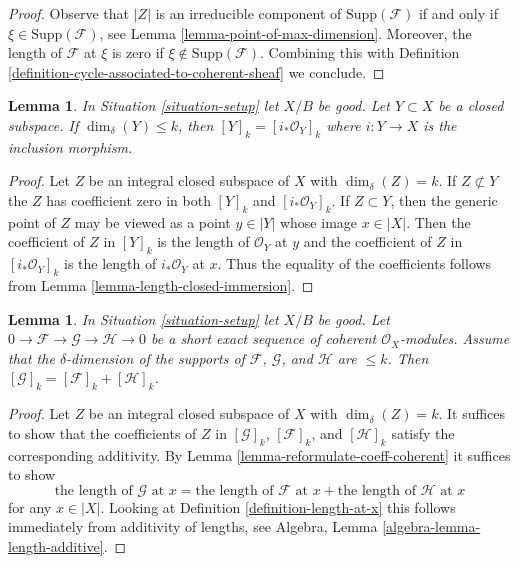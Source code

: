 \documentclass{stacks-project}
\theoremstyle{plain}
\newtheorem{lemma}[subsection]{Lemma}
\theoremstyle{definition}
\theoremstyle{remark}
\numberwithin{equation}{subsection}
\begin{document}
\begin{proof}
Observe that $|Z|$ is an irreducible component of $\text{Supp}(\mathcal{F})$
if and only if $\xi \in \text{Supp}(\mathcal{F})$, see
Lemma \ref{lemma-point-of-max-dimension}.
Moreover, the length of $\mathcal{F}$ at $\xi$ is zero if
$\xi \not \in \text{Supp}(\mathcal{F})$. Combining this
with Definition \ref{definition-cycle-associated-to-coherent-sheaf}
we conclude.
\end{proof}

\begin{lemma}
\label{lemma-cycle-closed-coherent}
In Situation \ref{situation-setup} let $X/B$ be good.
Let $Y \subset X$ be a closed subspace.
If $\dim_\delta(Y) \leq k$, then $[Y]_k = [i_*\mathcal{O}_Y]_k$
where $i : Y \to X$ is the inclusion morphism.
\end{lemma}

\begin{proof}
Let $Z$ be an integral closed subspace of $X$ with $\dim_\delta(Z) = k$.
If $Z \not \subset Y$ the $Z$ has coefficient zero in both
$[Y]_k$ and $[i_*\mathcal{O}_Y]_k$. If $Z \subset Y$, then
the generic point of $Z$ may be viewed as a point $y \in |Y|$
whose image $x \in |X|$. Then the coefficient of $Z$ in
$[Y]_k$ is the length of $\mathcal{O}_Y$ at $y$ and the
coefficient of $Z$ in $[i_*\mathcal{O}_Y]_k$ is the length
of $i_*\mathcal{O}_Y$ at $x$. Thus the equality of the coefficients
follows from Lemma \ref{lemma-length-closed-immersion}.
\end{proof}

\begin{lemma}
\label{lemma-additivity-sheaf-cycle}
In Situation \ref{situation-setup} let $X/B$ be good.
Let $0 \to \mathcal{F} \to \mathcal{G} \to \mathcal{H} \to 0$
be a short exact sequence of coherent $\mathcal{O}_X$-modules.
Assume that the $\delta$-dimension of the supports
of $\mathcal{F}$, $\mathcal{G}$, and $\mathcal{H}$ are $\leq k$.
Then $[\mathcal{G}]_k = [\mathcal{F}]_k + [\mathcal{H}]_k$.
\end{lemma}

\begin{proof}
Let $Z$ be an integral closed subspace of $X$ with $\dim_\delta(Z) = k$.
It suffices to show that the coefficients of
$Z$ in $[\mathcal{G}]_k$, $[\mathcal{F}]_k$, and $[\mathcal{H}]_k$
satisfy the corresponding additivity. By
Lemma \ref{lemma-reformulate-coeff-coherent}
it suffices to show
$$
\text{the length of }\mathcal{G}\text{ at }x =
\text{the length of }\mathcal{F}\text{ at }x +
\text{the length of }\mathcal{H}\text{ at }x
$$
for any $x \in |X|$. Looking at Definition \ref{definition-length-at-x}
this follows immediately from additivity of lengths, see
Algebra, Lemma \ref{algebra-lemma-length-additive}.
\end{proof}
\end{document}
